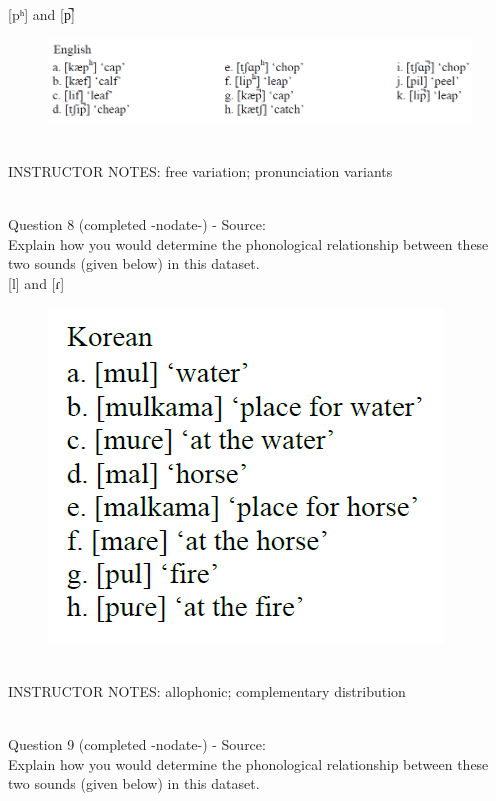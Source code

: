\documentclass[12pt]{article}
\begin{document}
{[pʰ]} and {[p̚]}

\begin{figure}[H]
\includegraphics{../images/english_labials.png}
\end{figure}

~\\
INSTRUCTOR NOTES: free variation; pronunciation variants


~\\

{\large Question 8} (completed -nodate-) - Source: \\

Explain how you would determine the phonological relationship between these two sounds (given below) in this dataset.\\

{[l]} and {[ɾ]}

\begin{figure}[H]
\includegraphics{../images/korean.png}
\end{figure}

~\\
INSTRUCTOR NOTES: allophonic; complementary distribution


~\\

{\large Question 9} (completed -nodate-) - Source: \\

Explain how you would determine the phonological relationship between these two sounds (given below) in this dataset.\\
\end{document}
